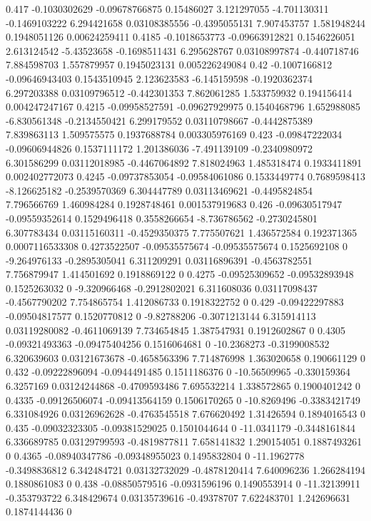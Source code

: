 {0.417 -0.1030302629 -0.09678766875 0.15486027 3.121297055 -4.701130311 -0.1469103222 6.294421658 0.03108385556 -0.4395055131 7.907453757 1.581948244 0.1948051126 0.00624259411
0.4185 -0.1018653773 -0.09663912821 0.1546226051 2.613124542 -5.43523658 -0.1698511431 6.295628767 0.03108997874 -0.440718746 7.884598703 1.557879957 0.1945023131 0.005226249084
0.42 -0.1007166812 -0.09646943403 0.1543510945 2.123623583 -6.145159598 -0.1920362374 6.297203388 0.03109796512 -0.442301353 7.862061285 1.533759932 0.194156414 0.004247247167
0.4215 -0.09958527591 -0.09627929975 0.1540468796 1.652988085 -6.830561348 -0.2134550421 6.299179552 0.03110798667 -0.4442875389 7.839863113 1.509575575 0.1937688784 0.003305976169
0.423 -0.09847222034 -0.09606944826 0.1537111172 1.201386036 -7.491139109 -0.2340980972 6.301586299 0.03112018985 -0.4467064892 7.818024963 1.485318474 0.1933411891 0.002402772073
0.4245 -0.09737853054 -0.09584061086 0.1533449774 0.7689598413 -8.126625182 -0.2539570369 6.304447789 0.03113469621 -0.4495824854 7.796566769 1.460984284 0.1928748461 0.001537919683
0.426 -0.09630517947 -0.09559352614 0.1529496418 0.3558266654 -8.736786562 -0.2730245801 6.307783434 0.03115160311 -0.4529350375 7.775507621 1.436572584 0.192371365 0.0007116533308
0.4273522507 -0.09535575674 -0.09535575674 0.1525692108 0 -9.264976133 -0.2895305041 6.311209291 0.03116896391 -0.4563782551 7.756879947 1.414501692 0.1918869122 0
0.4275 -0.09525309652 -0.09532893948 0.1525263032 0 -9.320966468 -0.2912802021 6.311608036 0.03117098437 -0.4567790202 7.754865754 1.412086733 0.1918322752 0
0.429 -0.09422297883 -0.09504817577 0.1520770812 0 -9.82788206 -0.3071213144 6.315914113 0.03119280082 -0.4611069139 7.734654845 1.387547931 0.1912602867 0
0.4305 -0.09321493363 -0.09475404256 0.1516064681 0 -10.2368273 -0.3199008532 6.320639603 0.03121673678 -0.4658563396 7.714876998 1.363020658 0.190661129 0
0.432 -0.09222896094 -0.0944491485 0.1511186376 0 -10.56509965 -0.330159364 6.3257169 0.03124244868 -0.4709593486 7.695532214 1.338572865 0.1900401242 0
0.4335 -0.09126506074 -0.09413564159 0.1506170265 0 -10.8269496 -0.3383421749 6.331084926 0.03126962628 -0.4763545518 7.676620492 1.31426594 0.1894016543 0
0.435 -0.09032323305 -0.09381529025 0.1501044644 0 -11.0341179 -0.3448161844 6.336689785 0.03129799593 -0.4819877811 7.658141832 1.290154051 0.1887493261 0
0.4365 -0.08940347786 -0.09348955023 0.1495832804 0 -11.1962778 -0.3498836812 6.342484721 0.03132732029 -0.4878120414 7.640096236 1.266284194 0.1880861083 0
0.438 -0.08850579516 -0.0931596196 0.1490553914 0 -11.32139911 -0.353793722 6.348429674 0.03135739616 -0.49378707 7.622483701 1.242696631 0.1874144436 0
}
